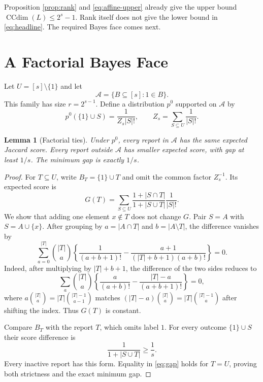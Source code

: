 \documentclass[twoside]{article}
\newtheorem{lemma}[theorem]{Lemma}
\newcommand{\CCdim}{\operatorname{CCdim}}
\newcommand{\1}{\mathbf 1}
\begin{document}
Proposition \ref{prop:rank} and \eqref{eq:affine-upper} already give the upper bound $\CCdim(L)\leq2^s-1$. Rank itself does not give the lower bound in \eqref{eq:headline}. The required Bayes face comes next.

\section{A Factorial Bayes Face}

Let $U=[s]\setminus\{1\}$ and let
\begin{equation}
\mathcal A=\{B\subseteq[s]:1\in B\}.
\end{equation}
This family has size $r=2^{s-1}$. Define a distribution $p^0$ supported on $\mathcal A$ by
\begin{equation}
p^0(\{1\}\cup S)=\frac{1}{Z_s|S|!},
\qquad
Z_s=\sum_{S\subseteq U}\frac1{|S|!}.
\label{eq:factorial-law}
\end{equation}

\begin{lemma}[Factorial ties]
\label{lem:factorial}
Under $p^0$, every report in $\mathcal A$ has the same expected Jaccard score. Every report outside $\mathcal A$ has smaller expected score, with gap at least $1/s$. The minimum gap is exactly $1/s$.
\end{lemma}

\begin{proof}
For $T\subseteq U$, write $B_T=\{1\}\cup T$ and omit the common factor $Z_s^{-1}$. Its expected score is
\begin{equation}
G(T)=\sum_{S\subseteq U}\frac{1+|S\cap T|}{1+|S\cup T|}\frac1{|S|!}.
\label{eq:G}
\end{equation}
We show that adding one element $x\notin T$ does not change $G$. Pair $S=A$ with $S=A\cup\{x\}$. After grouping by $a=|A\cap T|$ and $b=|A\setminus T|$, the difference vanishes by
\begin{equation}
\sum_{a=0}^{|T|}\binom{|T|}{a}
\left\{
\frac1{(a+b+1)!}
-\frac{a+1}{(|T|+b+1)(a+b)!}
\right\}=0.
\label{eq:cancellation}
\end{equation}
Indeed, after multiplying by $|T|+b+1$, the difference of the two sides reduces to
\begin{equation}
\sum_a\binom{|T|}{a}
\left\{
\frac{a}{(a+b)!}-\frac{|T|-a}{(a+b+1)!}
\right\}=0,
\end{equation}
where $a\binom{|T|}{a}=|T|\binom{|T|-1}{a-1}$ matches $(|T|-a)\binom{|T|}{a}=|T|\binom{|T|-1}{a}$ after shifting the index. Thus $G(T)$ is constant.

Compare $B_T$ with the report $T$, which omits label $1$. For every outcome $\{1\}\cup S$ their score difference is
\begin{equation}
\frac{1}{1+|S\cup T|}\geq\frac1s.
\label{eq:gap}
\end{equation}
Every inactive report has this form. Equality in \eqref{eq:gap} holds for $T=U$, proving both strictness and the exact minimum gap.
\end{proof}
\end{document}

